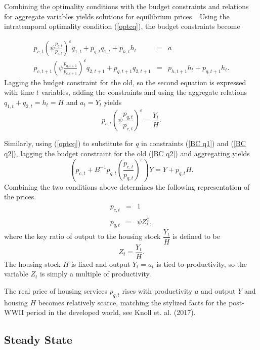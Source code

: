 \documentclass{article}
\begin{document}
\begin{doublespace}
Combining the optimality conditions with the budget constraints and
relations for aggregate variables yields solutions for equilibrium prices. \
Using the intratemporal optimality condition (\ref{optcq}), the budget
constraints become

\begin{eqnarray}
p_{c,t}\left( \psi \frac{p_{q,t}}{p_{c,t}}\right) ^{\varepsilon
}q_{1,t}+p_{q,t}q_{1,t}+p_{h,t}h_{t} &=&a  \label{BC q1} \\
p_{c,t+1}\left( \psi \frac{p_{q,t+1}}{p_{c,t+1}}\right) ^{\varepsilon
}q_{2,t+1}+p_{q,t+1}q_{2,t+1} &=&p_{h,t+1}h_{t}+p_{q,t+1}h_{t}.
\label{BC q2}
\end{eqnarray}%
Lagging the budget constraint for the old, so the second equation is
expressed with time $t$ variables, adding the constraints and using the
aggregate relations $q_{1,t}+q_{2,t}=h_{t}=H$ and $a_{t}=Y_{t}$ yields 
\begin{equation*}
p_{c,t}\left( \psi \frac{p_{q,t}}{p_{c,t}}\right) ^{\varepsilon }=\frac{Y_{t}%
}{H}.
\end{equation*}

Similarly, using (\ref{optcq}) to substitute for $q$ in constraints (\ref{BC
q1}) and (\ref{BC q2}), lagging the budget constraint for the old (\ref{BC
q2}) and aggregating yields%
\begin{equation*}
\left( p_{c,t}+B^{-1}p_{q,t}\left( \frac{p_{c,t}}{p_{q,t}}\right)
^{\varepsilon }\right) Y=Y+p_{q,t}H.
\end{equation*}%
Combining the two conditions above determines the following representation
of the prices.%
\begin{eqnarray}
p_{c,t} &=&1  \label{pc sol} \\
p_{q,t} &=&\psi Z_{t}^{\frac{1}{\varepsilon }},  \label{pq sol}
\end{eqnarray}%
where the key ratio of output to the housing stock $\dfrac{Y_{t}}{H}$ is
defined to be 
\begin{equation*}
Z_{t}=\dfrac{Y_{t}}{H}.
\end{equation*}%
The housing stock $H$ is fixed and output $Y_{t}=a_{t}$ is tied to
productivity, so the variable $Z_{t}$ is simply a multiple of productivity.

The real price of housing services $p_{q,t}$ rises with productivity $a$ and
output $Y$ and housing $H$ becomes relatively scarce, matching the stylized
facts for the post-WWII period in the developed world, see Knoll et. al.
(2017).

\subsection{Steady State}


\end{doublespace}
\end{document}
